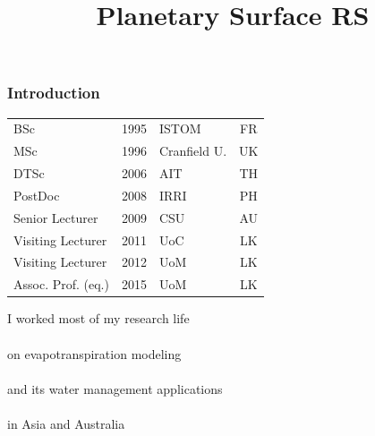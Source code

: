 \documentclass[serif,mathserif]{beamer}
\title[AIT\hspace{2em}\insertframenumber/\inserttotalframenumber]{Planetary Surface RS}
\begin{document}
{
\begin{frame}[plain]
\titlepage
\end{frame}}

\Large


\begin{frame}
  \frametitle{Introduction}
\begin{table}
\begin{tabular}{lclc}
 BSc & 1995 & ISTOM & FR\\
 MSc & 1996 & Cranfield U. & UK\\
 DTSc & 2006 & AIT & TH\\
 PostDoc & 2008 & IRRI & PH\pause\\
 Senior Lecturer & 2009 & CSU & AU\pause\\
 Visiting Lecturer & 2011 & UoC & LK\pause\\
 Visiting Lecturer & 2012 & UoM & LK\pause\\
 Assoc. Prof. (eq.) & 2015 & UoM & LK\\
 \end{tabular}
\end{table}

\end{frame}


\begin{frame}
\begin{center}
I worked most of my research life\\
\ \\
on evapotranspiration modeling\pause\\
\ \\
and its water management applications\pause\\
\ \\
in Asia and Australia
\end{center}
\end{frame}
\end{document}
